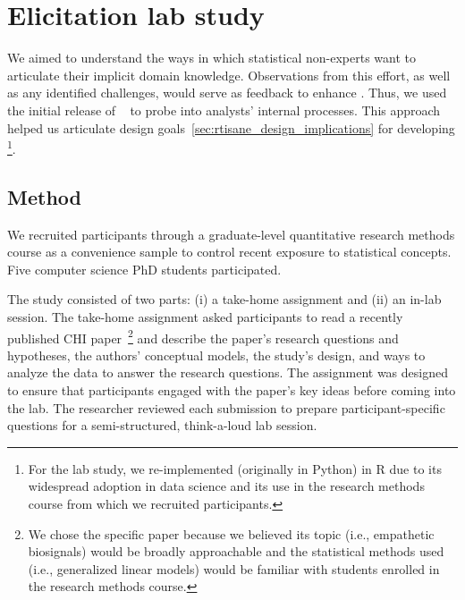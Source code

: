 \def\unit{\texttt{Unit}\xspace}
\def\measure{\texttt{Measure}\xspace}
\def\setup{\texttt{SetUp}\xspace}

\section{Elicitation lab study} \label{sec:exploratoryStudy}
We aimed to understand the ways in which statistical non-experts want to
articulate their implicit domain knowledge. Observations from this effort, as
well as any identified challenges, would serve as feedback to enhance \tisane.
Thus, we used the initial release of \tisane~\cite{jun2022tisane} to probe into analysts' internal processes. This approach helped us articulate
design goals~\autoref{sec:rtisane_design_implications} for developing
\rTisane\footnote{For the lab study, we re-implemented \tisane (originally in
Python) in R due to its widespread adoption in data science and its use in the 
research methods course from which we recruited participants.}.

\subsection{Method}
We recruited participants through a graduate-level quantitative research methods
course as a convenience sample to control recent exposure to
statistical concepts. Five computer science PhD students participated.

The study consisted of two parts: (i) a take-home assignment and (ii) an in-lab
session. The take-home assignment asked participants to read a recently
published CHI paper~\cite{winters2021heartbeat}\footnote{We chose the specific
paper because we believed its topic (i.e., empathetic biosignals) would be
broadly approachable and the statistical methods used (i.e., generalized linear
models) would be familiar with students enrolled in the research methods
course.} and describe the paper's research questions and hypotheses, the
authors' conceptual models, the study's design, and ways to analyze the data to
answer the research questions. The assignment was designed to ensure that
participants engaged with the paper's key ideas before coming into the lab. The
researcher reviewed each submission to prepare participant-specific questions
for a semi-structured, think-a-loud lab session. 

